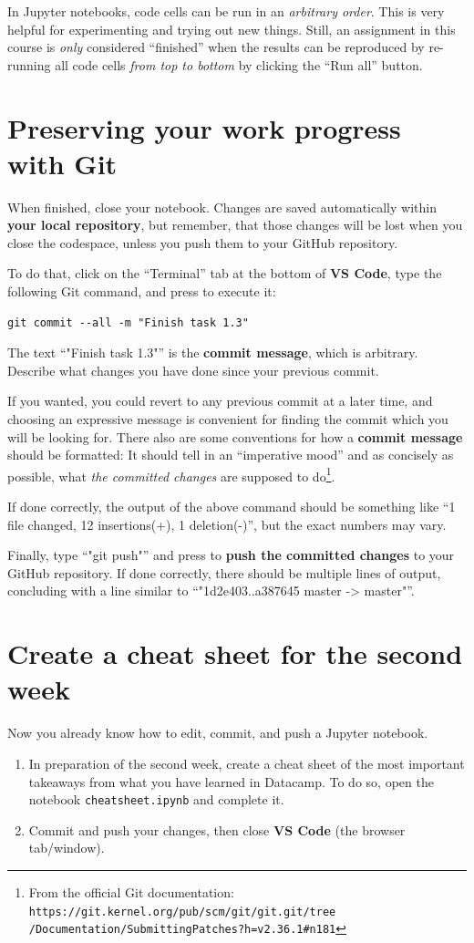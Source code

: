 \documentclass[12pt,a4paper]{article}
\begin{document}
In Jupyter notebooks, code cells can be run in an \emph{arbitrary order}. This is very helpful for experimenting and trying out new things. Still, an assignment in this course is \emph{only} considered ``finished'' when the results can be reproduced by re-running all code cells \emph{from top to bottom} by clicking the ``Run all'' button.

\section{Preserving your work progress with Git}
\label{task:git}

When finished, close your notebook. Changes are saved automatically within \textbf{your local repository}, but remember, that those changes will be lost when you close the codespace, unless you push them to your GitHub repository.

To do that, click on the ``Terminal'' tab at the bottom of \textbf{VS Code}, type the following Git command, and press \Return to execute it:
\begin{Verbatim}[frame=single]
git commit --all -m "Finish task 1.3"
\end{Verbatim}
The text ``"Finish task 1.3"'' is the \textbf{commit message}, which is arbitrary. Describe what changes you have done since your previous commit.

If you wanted, you could revert to any previous commit at a later time, and choosing an expressive message is convenient for finding the commit which you will be looking for. There also are some conventions for how a \textbf{commit message} should be formatted: It should tell in an ``imperative mood'' and as concisely as possible, what \emph{the committed changes} are supposed to do\footnote{From the official Git documentation: \texttt{https://git.kernel.org/pub/scm/git/git.git/tree\\/Documentation/SubmittingPatches?h=v2.36.1\#n181}}.

If done correctly, the output of the above command should be something like ``1 file changed, 12 insertions(+), 1 deletion(-)'', but the exact numbers may vary.

Finally, type ``"git push"'' and press \Return to \textbf{push the committed changes} to your GitHub repository. If done correctly, there should be multiple lines of output, concluding with a line similar to ``"1d2e403..a387645 master -> master"''.

\section{Create a cheat sheet for the second week}
Now you already know how to edit, commit, and push a Jupyter notebook.
\begin{enumerate}
    \item In preparation of the second week, create a cheat sheet of the most important takeaways from what you have learned in Datacamp. To do so, open the notebook \texttt{cheatsheet.ipynb} and complete it.
    \item Commit and push your changes, then close \textbf{VS Code} (the browser tab/window).
\end{enumerate}
\end{document}
